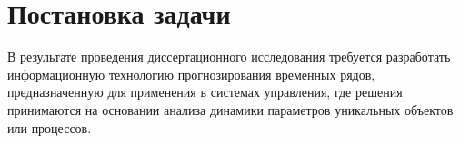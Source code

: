 %
%




\section{Постановка задачи}

В результате проведения диссертационного исследования требуется разработать информационную технологию прогнозирования временных рядов, предназначенную для применения в системах управления, где решения принимаются на основании анализа динамики параметров уникальных объектов или процессов.


